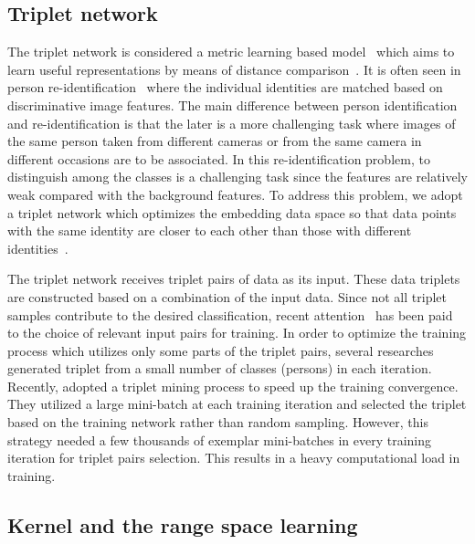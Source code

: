 \documentclass[sigconf]{acmart}
\begin{document}
\subsection{Triplet network}
The triplet network is considered a metric learning based model~\cite{weinberger2006distance} which aims to learn useful representations by means of distance comparison~\cite{hoffer2015deep}. 
It is often seen in person re-identification~\cite{chen2017beyond,cheng2016person,ding2015deep,schroff2015facenet,wang2016joint} where the individual identities are matched based on discriminative image features. The main difference between person identification and re-identification is that the later is a more challenging task where images of the same person taken from different cameras or from the same camera in different occasions are to be associated. In this re-identification problem, to distinguish among the classes is a challenging task since the features are relatively weak compared with the background features. To address this problem, we adopt a triplet network which optimizes the embedding data space so that data points with the same identity are closer to each other than those with different identities~\cite{hermans2017defense}.

The triplet network receives triplet pairs of data as its input. These data triplets are constructed based on a combination of the input data. Since not all triplet samples contribute to the desired classification, recent attention~\cite{schroff2015facenet} has been paid to the choice of relevant input pairs for training. In order to optimize the training process which utilizes only some parts of the triplet pairs, several researches~\cite{cheng2016person,ding2015deep,wang2016joint} generated triplet from a small number of classes (persons) in each iteration. Recently, \cite{schroff2015facenet} adopted a triplet mining process to speed up the training convergence. They utilized a large mini-batch at each training iteration and selected the triplet based on the training network rather than random sampling. However, this strategy needed a few thousands of exemplar mini-batches in every training iteration for triplet pairs selection. This results in a heavy computational load in training.

\subsection{Kernel and the range space learning~\cite{toh100,toh2018learning,toh2018analytic,toh2018gradient}}\label{kar}
\end{document}
